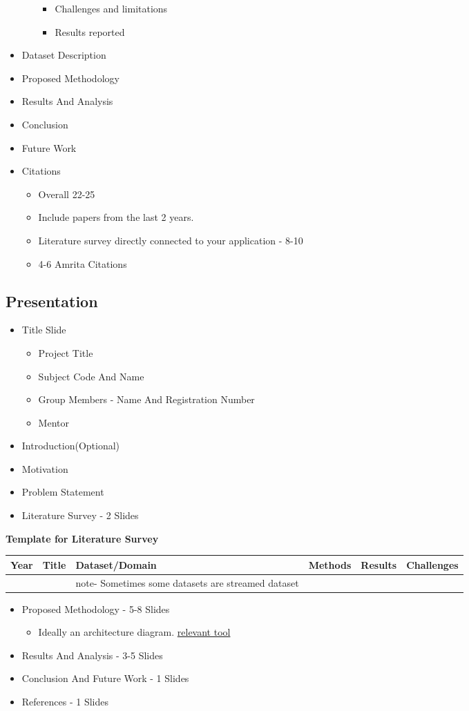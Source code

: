 \documentclass[11pt]{article}
\begin{document}
\begin{itemize}
\begin{itemize}
\begin{itemize}
\item Challenges and limitations
\item Results reported
\end{itemize}
\end{itemize}
\item Dataset Description
\item Proposed Methodology
\item Results And Analysis
\item Conclusion
\item Future Work
\item Citations
\begin{itemize}
\item Overall 22-25
\item Include papers from the last 2 years.
\item Literature survey directly connected to your application - 8-10
\item 4-6 Amrita Citations
\end{itemize}
\end{itemize}
\subsection{Presentation}
\label{sec:org68f7209}
\begin{itemize}
\item Title Slide
\begin{itemize}
\item Project Title
\item Subject Code And Name
\item Group Members - Name And Registration Number
\item Mentor
\end{itemize}
\item Introduction(Optional)
\item Motivation
\item Problem Statement
\item Literature Survey - 2 Slides
\end{itemize}
\textbf{Template for Literature Survey}
\begin{center}
\begin{tabular}{llllll}
\hline
Year & Title & Dataset/Domain & Methods & Results & Challenges\\
\hline
 &  & note- Sometimes some datasets are streamed dataset &  &  & \\
\hline
\end{tabular}
\end{center}
\begin{itemize}
\item Proposed Methodology - 5-8 Slides
\begin{itemize}
\item Ideally an architecture diagram. \href{http:app.diagrams.net/}{relevant tool}
\end{itemize}

\item Results And Analysis - 3-5 Slides
\item Conclusion And Future Work - 1 Slides
\item References - 1 Slides
\end{itemize}
\end{document}
